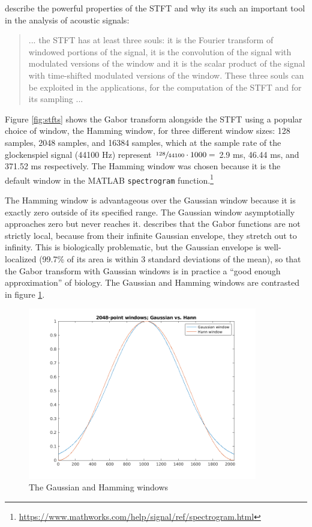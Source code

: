 \documentclass[report.tex]{subfiles}
\begin{document}
\textcite{doerflersouls} describe the powerful properties of the STFT and why its such an important tool in the analysis of acoustic signals:

\begin{quote}
	... the STFT has at least three souls: it is the Fourier transform of windowed portions of the signal, it is the convolution of the signal with modulated versions of the window and it is the scalar product of the signal with time-shifted modulated versions of the window. These three souls can be exploited in the applications, for the computation of the STFT and for its sampling ...
\end{quote}

Figure \ref{fig:stfts} shows the Gabor transform alongside the STFT using a popular choice of window, the Hamming window, for three different window sizes: 128 samples, 2048 samples, and 16384 samples, which at the sample rate of the glockenspiel signal (44100 Hz) represent $\sfrac{128}{44100}\cdot 1000 = $ 2.9 ms, 46.44 ms, and 371.52 ms respectively. The Hamming window was chosen because it is the default window in the MATLAB \Verb#spectrogram# function.\footnote{\url{https://www.mathworks.com/help/signal/ref/spectrogram.html}}

The Hamming window is advantageous over the Gaussian window because it is exactly zero outside of its specified range. The Gaussian window asymptotially approaches zero but never reaches it. \textcite{gabor2} describes that the Gabor functions are not strictly local, because from their infinite Gaussian envelope, they stretch out to infinity. This is biologically problematic, but the Gaussian envelope is well-localized (99.7\% of its area is within 3 standard deviations of the mean), so that the Gabor transform with Gaussian windows is in practice a ``good enough approximation'' of biology. The Gaussian and Hamming windows are contrasted in figure \ref{fig:windows}.

\begin{figure}[ht]
	\centering
	\includegraphics[width=10cm]{./images-tftheory/gaussianvshann.png}
	\caption{The Gaussian and Hamming windows}
	\label{fig:windows}
\end{figure}
\end{document}
